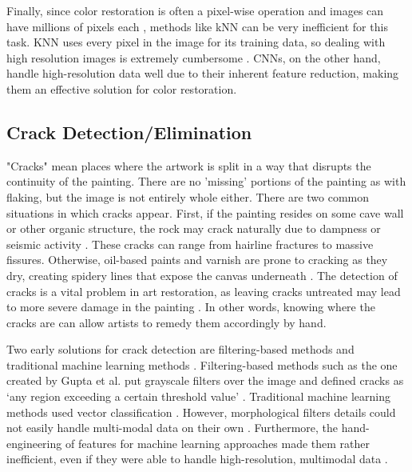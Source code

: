 \documentclass[a4paper,11pt]{article}
\begin{document}
Finally, since color restoration is often a pixel-wise operation and images can have millions of pixels each \cite{palomero}, methods like kNN can be very inefficient for this task. KNN uses every pixel in the image for its training data, so dealing with high resolution images is extremely cumbersome  \cite{zeng2018}. CNNs, on the other hand, handle high-resolution data well due to their inherent feature reduction, making them an effective solution for color restoration. 


\subsection{Crack Detection/Elimination}

"Cracks" mean places where the artwork is split in a way that disrupts the continuity of the painting. There are no 'missing' portions of the painting as with flaking, but the image is not entirely whole either. There are two common situations in which cracks appear. First, if the painting resides on some cave wall or other organic structure, the rock may crack naturally due to dampness or seismic activity \cite{dulecha}. These cracks can range from hairline fractures to massive fissures. Otherwise, oil-based paints and varnish are prone to cracking as they dry, creating spidery lines that expose the canvas underneath \cite{barni2005}\cite{dulecha}. The detection of cracks is a vital problem in art restoration, as leaving cracks untreated may lead to more severe damage in the painting \cite{dulecha}. In other words, knowing where the cracks are can allow artists to remedy them accordingly by hand. 

Two early solutions for crack detection are filtering-based methods and traditional machine learning methods \cite{agupta}\cite{pizurica}\cite{cornelis}. Filtering-based methods such as the one created by Gupta et al. put grayscale filters over the image and defined cracks as ‘any region exceeding a certain threshold value’ \cite{agupta}. Traditional machine learning methods used vector classification \cite{pizurica}\cite{cornelis}. However, morphological filters details could not easily handle multi-modal data on their own \cite{gupta}. Furthermore, the hand-engineering of features for machine learning approaches made them rather inefficient, even if they were able to handle high-resolution, multimodal data \cite{cornelis}. 
\end{document}
